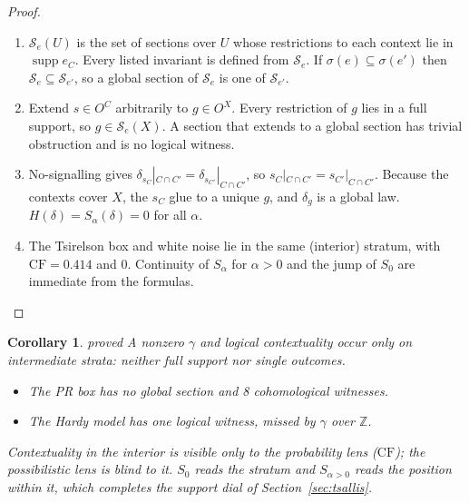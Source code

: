 \documentclass[11pt]{article}
\newtheorem{corollary}[theorem]{Corollary}
\theoremstyle{definition}
\theoremstyle{remark}
\newcommand{\Z}{\mathbb{Z}}
\newcommand{\CF}{\mathrm{CF}}
\newcommand{\st}[1]{\textsf{\small\color{gray}#1}}
\begin{document}
\begin{proof}
\begin{enumerate}
  \item $\mathcal S_e(U)$ is the set of sections over $U$ whose restrictions to each context lie in $\operatorname{supp}e_C$. Every listed invariant is defined from $\mathcal S_e$. If $\sigma(e)\subseteq\sigma(e')$ then $\mathcal S_e\subseteq\mathcal S_{e'}$, so a global section of $\mathcal S_e$ is one of $\mathcal S_{e'}$.
  \item Extend $s\in O^C$ arbitrarily to $g\in O^X$. Every restriction of $g$ lies in a full support, so $g\in\mathcal S_e(X)$. A section that extends to a global section has trivial obstruction and is no logical witness.
  \item No-signalling gives $\delta_{s_C}|_{C\cap C'}=\delta_{s_{C'}}|_{C\cap C'}$, so $s_C|_{C\cap C'}=s_{C'}|_{C\cap C'}$. Because the contexts cover $X$, the $s_C$ glue to a unique $g$, and $\delta_g$ is a global law. $H(\delta)=S_\alpha(\delta)=0$ for all $\alpha$.
  \item The Tsirelson box and white noise lie in the same (interior) stratum, with $\CF=0.414$ and $0$. Continuity of $S_\alpha$ for $\alpha>0$ and the jump of $S_0$ are immediate from the formulas.
\end{enumerate}
\end{proof}

\begin{corollary}\label{res:auto17}\st{proved}
A nonzero $\gamma$ and logical contextuality occur only on \emph{intermediate} strata: neither full support nor single outcomes.
\begin{itemize}
  \item The PR box has no global section and 8 cohomological witnesses.
  \item The Hardy model has one logical witness, missed by $\gamma$ over $\Z$.
\end{itemize}
Contextuality in the interior is visible only to the probability lens ($\CF$); the possibilistic lens is blind to it. $S_0$ reads the stratum and $S_{\alpha>0}$ reads the position within it, which completes the support dial of Section~\ref{sec:tsallis}.
\end{corollary}
\end{document}
